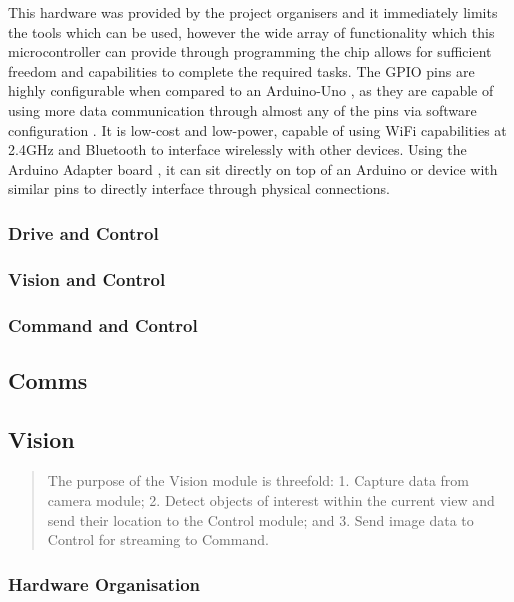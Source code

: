 \documentclass[a4paper]{article}
\begin{document}
This hardware was provided by the project organisers and it immediately limits
the tools which can be used, however the wide array of functionality which
this microcontroller can provide through programming the chip allows
for sufficient freedom and capabilities to complete the required tasks. The
GPIO pins are highly configurable when compared to an Arduino-Uno \cite{MicrocontrollerComparison}, as they
are capable of using more data communication through almost any of the pins
via software configuration \cite{ESP32PinOut}. It is low-cost and low-power, 
capable of using WiFi capabilities at 2.4GHz and Bluetooth \cite{ESP32Datasheet} to interface wirelessly
with other devices. Using the Arduino Adapter board \cite{ESP32ArduinoAdapter}, it can sit directly on top of
an Arduino or device with similar pins to directly interface through physical connections. 


\subsubsection{Drive and Control}

\subsubsection{Vision and Control}

\subsubsection{Command and Control}

\subsection{Comms}

\subsection{Vision}
\begin{abstract}
    The purpose of the Vision module is threefold:
    1. Capture data from camera module;
    2. Detect objects of interest within the current view and 
        send their location to the Control module; and
    3. Send image data to Control for streaming to Command. 
\end{abstract}

\subsubsection{Hardware Organisation}
\end{document}
